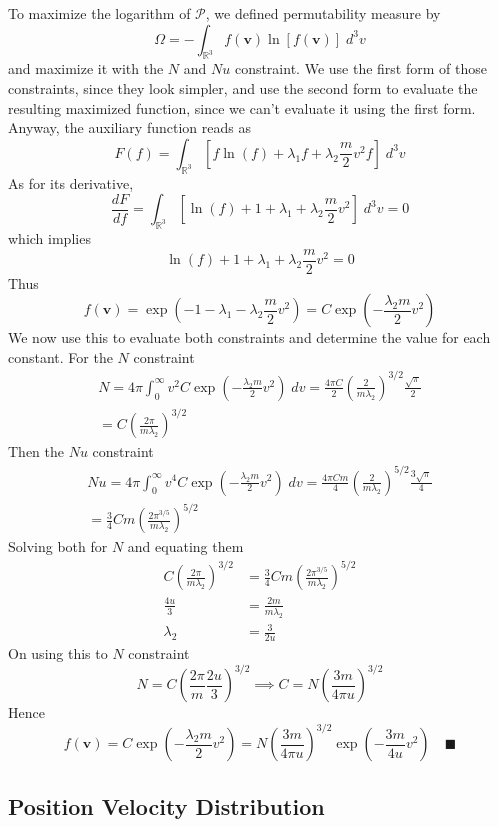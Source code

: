 \documentclass[../../../Main.tex]{subfiles}
\begin{document}
To maximize the logarithm of $\mathcal{P}$, we defined permutability measure by 
\begin{equation*}
    \Omega = - \int_{\mathbb{R}^3}f(\mathbf{v})\ln [f(\mathbf{v})]\;d^3v
\end{equation*}
and maximize it with the $N$ and $Nu$ constraint. We use the first form of those constraints, since they look simpler, and use the second form to evaluate the resulting maximized function, since we can't evaluate it using the first form. Anyway, the auxiliary function reads as
\begin{equation*}
    F(f)=\int_{\mathbb{R}^3} \left[f\ln (f)+\lambda_1f+\lambda_2\frac{m}{2}v^2f\right]\;d^3v
\end{equation*}
As for its derivative,
\begin{equation*}
    \frac{dF}{df}=\int_{\mathbb{R}^3} \left[\ln(f)+1+\lambda_1+\lambda_2\frac{m}{2}v^2\right]\;d^3v=0
\end{equation*}
which implies
\begin{equation*}
    \ln(f)+1+\lambda_1+\lambda_2\frac{m}{2}v^2=0
\end{equation*}
Thus
\begin{equation*}
    f(\mathbf{v})=\exp \left(-1-\lambda_1-\lambda_2\frac{m}{2}v^2\right)=C\exp\left(-\frac{\lambda_2m}{2}v^2\right)
\end{equation*}
We now use this to evaluate both constraints and determine the value for each constant. For the $N$ constraint
\begin{multline*}
    N=4\pi\int_{0}^{\infty}v^2C\exp\left(-\frac{\lambda_2m}{2}v^2\right)\; dv=\frac{4\pi C}{2}\left(\frac{2}{m\lambda_2}\right)^{3/2}\frac{\sqrt{\pi}}{2}\\
    = C\left(\frac{2\pi}{m\lambda_2}\right)^{3/2}
\end{multline*} 
Then the $Nu$ constraint
\begin{multline*}
    Nu=4\pi \int_{0}^{\infty}v^4C\exp\left(-\frac{\lambda_2m}{2}v^2\right)\;dv = \frac{4\pi Cm}{4} \left(\frac{2}{m\lambda_2}\right)^{5/2}\frac{3\sqrt{\pi}}{4}\\
    =\frac{3}{4} Cm\left(\frac{2\pi^{3/5}}{m\lambda_2}\right)^{5/2}
\end{multline*}
Solving both for $N$ and equating them 
\begin{align*}
    C\left(\frac{2\pi}{m\lambda_2}\right)^{3/2} & = \frac{3}{4} Cm\left(\frac{2\pi^{3/5}}{m\lambda_2}\right)^{5/2}\\
    \frac{4u}{3}&=\frac{2m}{m\lambda_2}\\
    \lambda_2&=\frac{3}{2u}
\end{align*}
On using this to $N$ constraint
\begin{equation*}
    N=C\left(\frac{2\pi}{m}\frac{2u}{3}\right)^{3/2}\implies C=N \left(\frac{3m}{4\pi u}\right)^{3/2}
\end{equation*}
Hence
\begin{equation*}
    f(\mathbf{v})=C\exp\left(-\frac{\lambda_2m}{2}v^2\right)= N \left(\frac{3m}{4\pi u}\right)^{3/2}\exp\left(-\frac{3m}{4u}v^2\right)\quad\blacksquare
\end{equation*}

\subsection*{Position Velocity Distribution}
\end{document}
